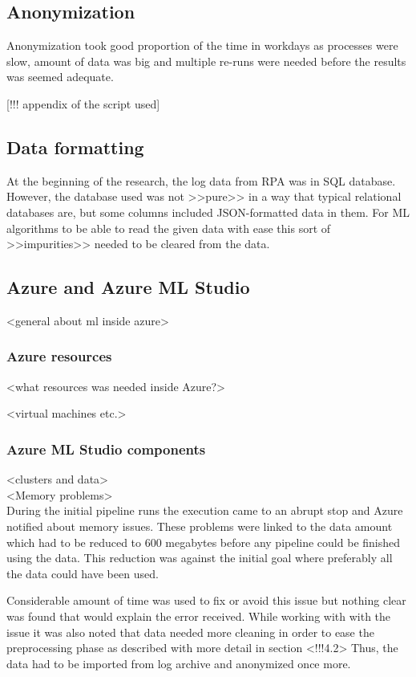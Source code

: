 \documentclass[english, 12pt, a4paper, elec, utf8, a-1b, online]{aaltothesis}
\begin{document}
\subsection{Anonymization}
Anonymization took good proportion of the time in workdays
as processes were slow,
amount of data was big
and multiple re-runs were needed
before the results was seemed adequate.

[!!! appendix of the script used]

\subsection{Data formatting}
At the beginning of the research,
the log data from RPA was in SQL database.
However,
the database used was not >>pure>>
in a way that typical relational databases are,
but some columns included JSON-formatted data in them.
For ML algorithms to be able to read the given data with ease
this sort of >>impurities>> needed to be cleared from the data.


\subsection{Azure and Azure ML Studio}

<general about ml inside azure>

\subsubsection*{Azure resources}

<what resources was needed inside Azure?>

<virtual machines etc.>




\subsubsection*{Azure ML Studio components}
<clusters and data>
\\

<Memory problems>
\\

During the initial pipeline runs
the execution came to an abrupt stop
and Azure notified about memory issues.
These problems were linked to the data amount
which had to be reduced to 600 megabytes
before any pipeline could be finished using the data.
This reduction was against the initial goal
where preferably all the data could have been used.

Considerable amount of time was used
to fix or avoid this issue
but nothing clear was found
that would explain the error received.
While working with with the issue
it was also noted
that data needed more cleaning
in order to ease the preprocessing phase
as described with more detail in section <!!!4.2>
Thus,
the data had to be imported from log archive
and anonymized once more.
\end{document}
